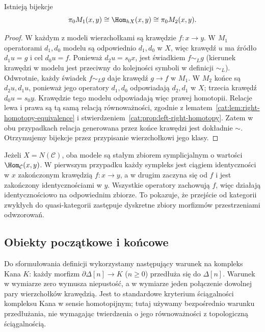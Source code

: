 \begin{stwierdzenie}\label{cat:prop:mapping-pi0}
Istnieją bijekcje
\[
 \pi_0M_1(x,y)\cong \Hom_{hX}(x,y)
 \cong\pi_0M_2(x,y).
\]
\end{stwierdzenie}
\begin{proof}
W każdym z modeli wierzchołkami są krawędzie $f:x\to y$. W $M_1$ operatorami $d_1,d_0$ modelu są odpowiednio $d_1,d_0$ w $X$, więc krawędź $u$ ma źródło $d_1u=g$ i cel $d_0u=f$. Ponieważ $d_2u=s_0x$, jest świadkiem $f\sim_L g$ (kierunek krawędzi w modelu jest przeciwny do kolejności symboli w definicji $\sim_L$). Odwrotnie, każdy świadek $f\sim_L g$ daje krawędź $g\to f$ w $M_1$. W $M_2$ końce są $d_2u,d_1u$, ponieważ jego operatory $d_1,d_0$ odpowiadają $d_2,d_1$ w $X$; trzecia krawędź $d_0u=s_0y$. Krawędzie tego modelu odpowiadają więc prawej homotopii. Relacje lewa i prawa są tą samą relacją równoważności, zgodnie z lematem~\ref{cat:lem:right-homotopy-equivalence} i stwierdzeniem~\ref{cat:prop:left-right-homotopy}. Zatem w obu przypadkach relacja generowana przez końce krawędzi jest dokładnie $\sim$. Otrzymujemy bijekcje przez przypisanie wierzchołkowi jego klasy.
\end{proof}

\begin{przyklad}\label{cat:ex:mapping-ordinary}
Jeżeli $X=N(\mathcal C)$, oba modele są stałym zbiorem symplicjalnym o wartości $\Hom_{\mathcal C}(x,y)$. W pierwszym przypadku każdy sympleks jest ciągiem identyczności w $x$ zakończonym krawędzią $f:x\to y$, a w drugim zaczyna się od $f$ i jest zakończony identycznościami w $y$. Wszystkie operatory zachowują $f$, więc działają identycznościowo na odpowiednim zbiorze. To pokazuje, że przejście od kategorii zwykłych do quasi-kategorii zastępuje dyskretne zbiory morfizmów przestrzeniami odwzorowań.
\end{przyklad}

\subsection{Obiekty początkowe i końcowe}

Do sformułowania definicji wykorzystamy następujący warunek na kompleks Kana $K$: każdy morfizm $\partial\Delta[n]\to K$ ($n\geq0$) przedłuża się do $\Delta[n]$. Warunek w wymiarze zero wymusza niepustość, a w wymiarze jeden połączenie dowolnej pary wierzchołków krawędzią. Jest to standardowe kryterium ściągalności kompleksu Kana w sensie homotopijnym; tutaj używamy bezpośrednio warunku przedłużania, nie wymagając twierdzenia o jego równoważności z topologiczną ściągalnością.

